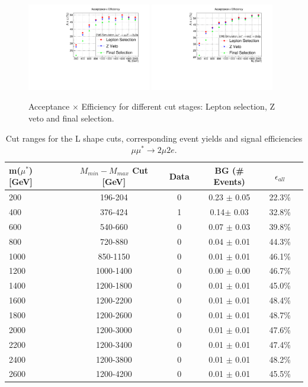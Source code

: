 \begin{figure}
 \begin{center}
  \includegraphics[width=0.48\textwidth]{plot/Effizienz_2mu2e.pdf}
  \includegraphics[width=0.48\textwidth]{plot/Effizienz_2e2mu.pdf}
 \end{center}
\caption{\label{fig:Efficiencies_L}Acceptance $\times$ Efficiency for different cut stages: Lepton selection, Z veto and final selection. }
\end{figure}



\begin{table}[h!]
\begin{center}
\begin{tabular}{|l|c|c|c|c|c|}
\hline
m($\mu^{*}$) [GeV] & $M_{min}-M_{max}$ Cut [GeV] & Data & BG (\# Events) & $\epsilon_{all}$ \\
\hline
\hline
200 & 196-204 & 0 & 0.23 $\pm$ 0.05 & 22.3\% \\
400 & 376-424 & 1 & 0.14$\pm$ 0.03 & 32.8\% \\
600 & 540-660 & 0 & 0.07 $\pm$ 0.03 & 39.8\% \\
800 & 720-880 & 0 & 0.04 $\pm$ 0.01 & 44.3\% \\
1000 & 850-1150 & 0 & 0.01 $\pm$ 0.01 & 46.1\% \\
1200 & 1000-1400 & 0 & 0.00 $\pm$ 0.00 & 46.7\% \\
1400 & 1200-1800 & 0 & 0.01 $\pm$ 0.01 & 45.0\% \\
1600 & 1200-2200 & 0 & 0.01 $\pm$ 0.01 & 48.4\% \\
1800 & 1200-2600 & 0 & 0.01 $\pm$ 0.01 & 48.7\% \\
2000 & 1200-3000 & 0 & 0.01 $\pm$ 0.01 & 47.6\% \\
2200 & 1200-3400 & 0 & 0.01 $\pm$ 0.01 & 47.4\% \\
2400 & 1200-3800 & 0 & 0.01 $\pm$ 0.01 & 48.2\% \\
2600 & 1200-4200 & 0 & 0.01 $\pm$ 0.01 & 45.5\% \\
\hline
\end{tabular}
\caption{\label{tab:LShape2}Cut ranges for the L shape cuts, corresponding event yields and signal efficiencies $\mu\mu^{*} \rightarrow 2\mu 2e$.}
\end{center}
\end{table} 

